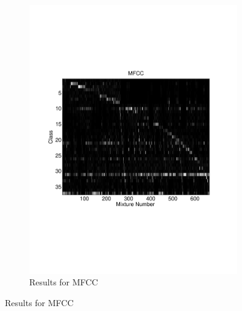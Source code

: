 \documentclass[a4paper,10pt,final]{ThesisStyle}
\begin{document}
\begin{figure}
\begin{subfigure}[b]{0.5\textwidth}
\includegraphics[width=0.99\textwidth]{images/mixture-mfcc.pdf}
\caption{Results for MFCC}
\end{subfigure}%


\end{figure}
\end{document}
